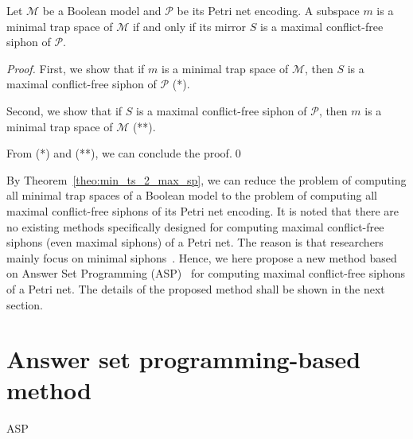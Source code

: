 \documentclass[runningheads]{llncs}
\begin{document}
\begin{theorem}
\label{theo:min_ts_2_max_sp}

  Let \(\mathcal{M}\) be a Boolean model and \(\mathcal{P}\) be its Petri net encoding. A subspace \(m\) is a minimal trap space of \(\mathcal{M}\) if and only if its mirror \(S\) is a maximal conflict-free siphon of \(\mathcal{P}\).

\end{theorem}

\begin{proof}

  First, we show that if \(m\) is a minimal trap space of \(\mathcal{M}\), then \(S\) is a maximal conflict-free siphon of \(\mathcal{P}\) (*).
  
  Second, we show that if \(S\) is a maximal conflict-free siphon of \(\mathcal{P}\), then \(m\) is a minimal trap space of \(\mathcal{M}\) (**).
  
  From (*) and (**), we can conclude the proof.\qed
  
\end{proof}

By Theorem~\ref{theo:min_ts_2_max_sp}, we can reduce the problem of computing all minimal trap spaces of a Boolean model to the problem of computing all maximal conflict-free siphons of its Petri net encoding. It is noted that there are no existing methods specifically designed for computing maximal conflict-free siphons (even maximal siphons) of a Petri net. The reason is that researchers mainly focus on minimal siphons~\cite{DBLP:journals/isci/LiuB16}. Hence, we here propose a new method based on Answer Set Programming (ASP)~\cite{DBLP:journals/aicom/GebserKKOSS11} for computing  maximal conflict-free siphons of a Petri net. The details of the proposed method shall be shown in the next section.

\section{Answer set programming-based method}

ASP
\end{document}

